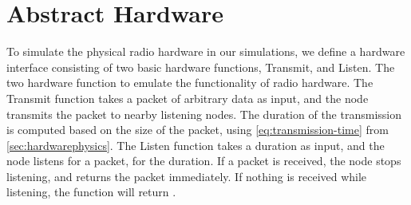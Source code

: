 \section{Abstract Hardware}\label{sec:interface}
To simulate the physical radio hardware in our simulations, we define a hardware interface consisting of two
basic hardware functions, Transmit, and Listen. The two hardware function to emulate the functionality of
radio hardware. The Transmit function takes a packet of arbitrary data as input, and the node transmits the
packet to nearby listening nodes. The duration of the transmission is computed based on the size of the
packet, using \autoref{eq:transmission-time} from \autoref{sec:hardwarephysics}. The Listen function takes a
duration as input, and the node listens for a packet, for the duration. If a packet is received, the node
stops listening, and returns the packet immediately. If nothing is received while listening, the function will
return \KwNull. 

%






